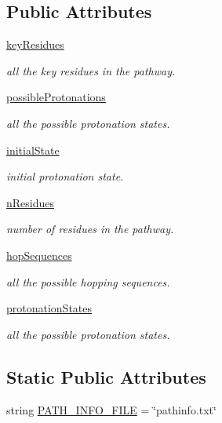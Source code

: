 \subsection*{Public Attributes}
\begin{DoxyCompactItemize}
\item 
\hyperlink{classxhbpathpy_1_1hb_path_1_1_hb_path_aafe90d4a4166ba875aab2cee3012cd69}{key\-Residues}
\begin{DoxyCompactList}\small\item\em all the key residues in the pathway. \end{DoxyCompactList}\item 
\hyperlink{classxhbpathpy_1_1hb_path_1_1_hb_path_a63c9f028abbc09e92aefbf4b65d00052}{possible\-Protonations}
\begin{DoxyCompactList}\small\item\em all the possible protonation states. \end{DoxyCompactList}\item 
\hyperlink{classxhbpathpy_1_1hb_path_1_1_hb_path_a702f32f452e98cca922244b5d003861a}{initial\-State}
\begin{DoxyCompactList}\small\item\em initial protonation state. \end{DoxyCompactList}\item 
\hyperlink{classxhbpathpy_1_1hb_path_1_1_hb_path_a57b7e261f0510a0793102eecffd8bb62}{n\-Residues}
\begin{DoxyCompactList}\small\item\em number of residues in the pathway. \end{DoxyCompactList}\item 
\hyperlink{classxhbpathpy_1_1hb_path_1_1_hb_path_a35382dbb6cd72418f95343650fde976e}{hop\-Sequences}
\begin{DoxyCompactList}\small\item\em all the possible hopping sequences. \end{DoxyCompactList}\item 
\hyperlink{classxhbpathpy_1_1hb_path_1_1_hb_path_aac00fb2999e064916005328fd4032763}{protonation\-States}
\begin{DoxyCompactList}\small\item\em all the possible protonation states. \end{DoxyCompactList}\end{DoxyCompactItemize}
\subsection*{Static Public Attributes}
\begin{DoxyCompactItemize}
\item 
string \hyperlink{classxhbpathpy_1_1hb_path_1_1_hb_path_aad2661f44ffc401393a1e8f017ffdb61}{P\-A\-T\-H\-\_\-\-I\-N\-F\-O\-\_\-\-F\-I\-L\-E} = \char`\"{}pathinfo.\-txt\char`\"{}
\end{DoxyCompactItemize}


